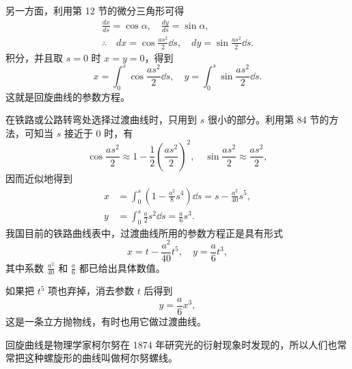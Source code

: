 另一方面，利用第 12 节的微分三角形可得
\begin{gather*}
  \frac{dx}{ds} = \cos\alpha, \quad \frac{dy}{ds} = \sin\alpha, \\
  \therefore\quad dx = \cos\frac{as^2}{2}\dd s, \quad dy = \sin\frac{as^2}{2}\dd s.
\end{gather*}
积分，并且取 $s = 0$ 时 $x = y = 0$，得到
\[
  x = \int_0^s \cos\frac{as^2}{2}\dd s, \quad y = \int_0^s \sin\frac{as^2}{2}\dd s.
\]
这就是回旋曲线的参数方程。

在铁路或公路转弯处选择过渡曲线时，只用到 $s$ 很小的部分。利用第 84 节的方法，可知当 $s$ 接近于 $0$ 时，有
\[
  \cos\frac{as^2}{2} \approx 1 - \frac{1}{2}\left(\frac{as^2}{2}\right)^2, \quad
  \sin\frac{as^2}{2} \approx \frac{as^2}{2},
\]
因而近似地得到
\begin{align*}
  x &= \int_0^s \left(1 - \frac{a^2}{8} s^4\right)\dd s = s - \frac{a^2}{40} s^5, \\
  y &= \int_0^s \frac{a}{2} s^2\dd s = \frac{a}{6} s^3.
\end{align*}
我国目前的铁路曲线表中，过渡曲线所用的参数方程正是具有形式
\[
  x = t - \frac{a^2}{40} t^5, \quad y = \frac{a}{6} t^3,
\]
其中系数 $\frac{a^2}{40}$ 和 $\frac{a}{6}$ 都已给出具体数值。

如果把 $t^5$ 项也弃掉，消去参数 $t$ 后得到
\[
  y = \frac{a}{6} x^3,
\]
这是一条立方抛物线，有时也用它做过渡曲线。

回旋曲线是物理学家柯尔努在 1874 年研究光的衍射现象时发现的，所以人们也常常把这种螺旋形的曲线叫做柯尔努螺线。
